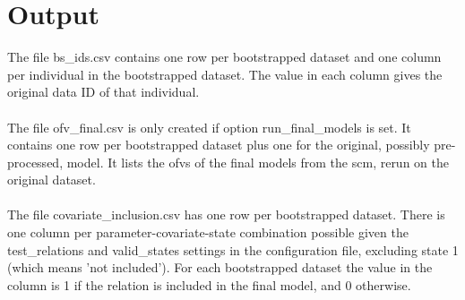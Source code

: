 \documentclass[a4paper,12pt]{article}
\begin{document}
\section{Output}

The file bs\_ids.csv contains one row per bootstrapped dataset and one column per individual in the bootstrapped dataset. The value in each column gives the original data ID of that individual.
\\
\\
The file ofv\_final.csv is only created if option run\_final\_models is set. It contains one row per bootstrapped dataset plus one for the original, possibly pre-processed, model. It lists the ofvs of the final models from the scm, rerun on the original dataset.
\\
\\
The file covariate\_inclusion.csv has one row per bootstrapped dataset. There is one column per parameter-covariate-state combination possible given the test\_relations and valid\_states settings in the configuration file, excluding state 1 (which means 'not included'). For each bootstrapped dataset the value in the column is 1 if the relation is included in the final model, and 0 otherwise.
\end{document}

